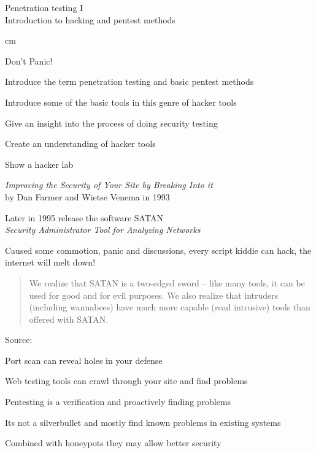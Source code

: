 \documentclass[Screen16to9,17pt]{foils}
\begin{document}

\mytitlepage
{Penetration testing I\\Introduction to hacking and pentest methods}

\LogoOn



 cm

\centerline{\color{titlecolor}\LARGE Don't Panic!}


\begin{list1}
\item Introduce the term penetration testing and basic pentest methods
\item Introduce some of the basic tools in this genre of hacker tools
\item Give an insight into the process of doing security testing
\item Create an understanding of hacker tools
\item Show a hacker lab
\end{list1}



\begin{list1}
\item \emph{Improving the Security of Your Site by Breaking Into it}\\ by
Dan Farmer and Wietse Venema in 1993
\item Later in 1995 release the software SATAN\\
\emph{Security Administrator Tool for Analyzing Networks}
\item Caused some commotion, panic and discussions, every script kiddie can hack, the internet will melt down!
\vskip 5mm
\begin{quote}
We realize that SATAN is a two-edged sword -- like
many tools, it can be used for good and for evil
purposes. We also realize that intruders (including
wannabees) have much more capable (read intrusive)
tools than offered with SATAN.
\end{quote}
\end{list1}

\vskip 1cm
Source:



\begin{list1}
\item Port scan can reveal holes in your defense
\item Web testing tools can crawl through your site and find problems
\item Pentesting is a verification and proactively finding problems
\item Its not a silverbullet and mostly find known problems in existing systems
\item Combined with honeypots they may allow better security
\end{list1}
\end{document}

